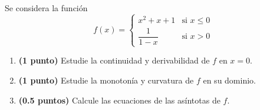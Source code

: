 
Se considera la función
\[
f(x)=\begin{cases}
x^2+x+1 & \text{si }x\leq 0\\
\dfrac{1}{1-x} & \text{si }x>0
\end{cases}
\]
\begin{enumerate}[label=\alph*)]
  \item \textbf{(1 punto)} Estudie la continuidad y derivabilidad de $f$ en $x=0$.
  \item \textbf{(1 punto)} Estudie la monotonía y curvatura de $f$ en su dominio.
  \item \textbf{(0.5 puntos)} Calcule las ecuaciones de las asíntotas de $f$.
\end{enumerate}
